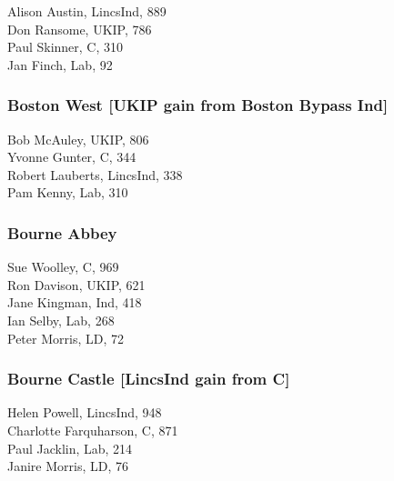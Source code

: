 \documentclass[a4paper,openany,10pt]{book}
\begin{document}


Alison Austin, LincsInd, 889\\
Don Ransome, UKIP, 786\\
Paul Skinner, C, 310\\
Jan Finch, Lab, 92\\


\subsubsection*{Boston West \hspace*{\fill}\nolinebreak[1]%
\enspace\hspace*{\fill}
[UKIP gain from Boston Bypass Ind]}



Bob McAuley, UKIP, 806\\
Yvonne Gunter, C, 344\\
Robert Lauberts, LincsInd, 338\\
Pam Kenny, Lab, 310\\


\subsubsection*{Bourne Abbey}



Sue Woolley, C, 969\\
Ron Davison, UKIP, 621\\
Jane Kingman, Ind, 418\\
Ian Selby, Lab, 268\\
Peter Morris, LD, 72\\


\subsubsection*{Bourne Castle \hspace*{\fill}\nolinebreak[1]%
\enspace\hspace*{\fill}
[LincsInd gain from C]}



Helen Powell, LincsInd, 948\\
Charlotte Farquharson, C, 871\\
Paul Jacklin, Lab, 214\\
Janire Morris, LD, 76\\
\end{document}
